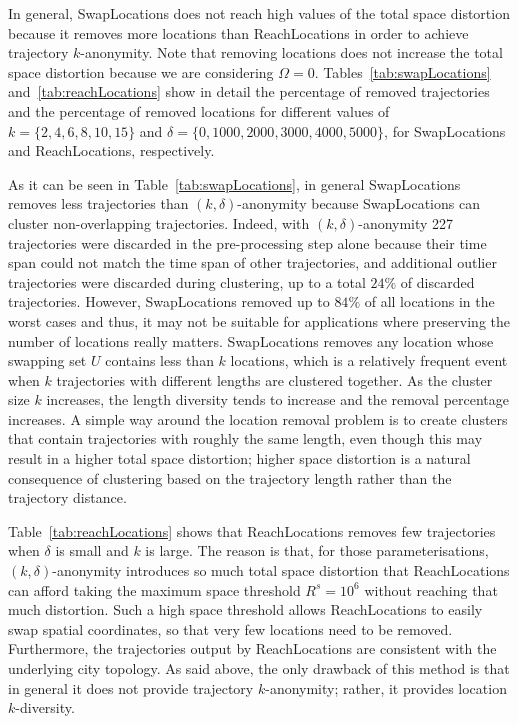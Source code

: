 In general, SwapLocations does not reach high values of the
total space distortion because it removes more locations than
ReachLocations in order to achieve trajectory $k$-anonymity. Note that
removing locations does not increase the total space distortion
because we are considering $\Omega = 0$. Tables~\ref{tab:swapLocations}
and~\ref{tab:reachLocations} show in detail the percentage of removed
trajectories and the percentage of removed locations for different
values of $k = \{2, 4, 6, 8, 10, 15\}$ and
$\delta = \{0, 1000, 2000, 3000, 4000, 5000\}$, for SwapLocations and
ReachLocations, respectively.

As it can be seen in Table~\ref{tab:swapLocations}, in general SwapLocations
removes less trajectories than $(k, \delta)$-anonymity because
SwapLocations can cluster non-overlapping trajectories. Indeed, with
$(k, \delta)$-anonymity 227 trajectories were discarded
in the pre-processing step alone
because their time span could not match the time
span of other trajectories, and additional outlier trajectories
were discarded during clustering, up to a total $24\%$ of discarded
trajectories. However, SwapLocations removed up to $84\%$ of all
locations in the worst cases
and thus, it may not be suitable for applications where
preserving the number of locations really matters. SwapLocations
removes any location whose swapping set $U$ contains less than
$k$ locations, which is a relatively frequent event when
$k$ trajectories with
different lengths are clustered together.
As the cluster size $k$ increases, the length diversity tends
to increase and the removal percentage increases.
A simple way around the location removal problem is to
create clusters that contain trajectories with roughly the same length,
even though this may result in a higher total space distortion;
higher space distortion is a natural consequence of clustering
based on the trajectory length rather than the trajectory distance.


Table~\ref{tab:reachLocations} shows that
ReachLocations removes few trajectories when $\delta$ is small
and $k$ is large. The reason is that, for those parameterisations,
$(k,\delta)$-anonymity introduces so much total space distortion
that ReachLocations can afford taking the
maximum space threshold $R^s=10^6$ without reaching
that much distortion. Such a high space threshold allows
ReachLocations to easily swap spatial coordinates, so that
very few locations need to be removed.
Furthermore, the trajectories output by ReachLocations
are consistent with the underlying city topology.
As said above, the only drawback of this method is that in general it
does not provide trajectory $k$-anonymity; rather, it provides
location $k$-diversity.


